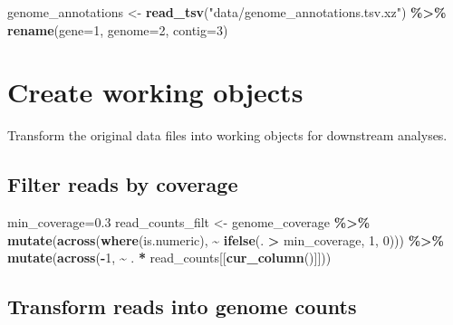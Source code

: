\documentclass[
]{book}
\newenvironment{Shaded}{\begin{snugshade}}{\end{snugshade}}
\newcommand{\AttributeTok}[1]{\textcolor[rgb]{0.13,0.29,0.53}{#1}}
\newcommand{\DecValTok}[1]{\textcolor[rgb]{0.00,0.00,0.81}{#1}}
\newcommand{\FloatTok}[1]{\textcolor[rgb]{0.00,0.00,0.81}{#1}}
\newcommand{\FunctionTok}[1]{\textcolor[rgb]{0.13,0.29,0.53}{\textbf{#1}}}
\newcommand{\NormalTok}[1]{#1}
\newcommand{\OtherTok}[1]{\textcolor[rgb]{0.56,0.35,0.01}{#1}}
\newcommand{\SpecialCharTok}[1]{\textcolor[rgb]{0.81,0.36,0.00}{\textbf{#1}}}
\newcommand{\StringTok}[1]{\textcolor[rgb]{0.31,0.60,0.02}{#1}}
\begin{document}
\begin{Shaded}
\begin{Highlighting}[]
\NormalTok{genome\_annotations }\OtherTok{\textless{}{-}} \FunctionTok{read\_tsv}\NormalTok{(}\StringTok{"data/genome\_annotations.tsv.xz"}\NormalTok{) }\SpecialCharTok{\%\textgreater{}\%}
    \FunctionTok{rename}\NormalTok{(}\AttributeTok{gene=}\DecValTok{1}\NormalTok{, }\AttributeTok{genome=}\DecValTok{2}\NormalTok{, }\AttributeTok{contig=}\DecValTok{3}\NormalTok{)}
\end{Highlighting}
\end{Shaded}

\section{Create working objects}\label{create-working-objects}

Transform the original data files into working objects for downstream
analyses.

\subsection{Filter reads by coverage}\label{filter-reads-by-coverage}

\begin{Shaded}
\begin{Highlighting}[]
\NormalTok{min\_coverage}\OtherTok{=}\FloatTok{0.3}
\NormalTok{read\_counts\_filt }\OtherTok{\textless{}{-}}\NormalTok{ genome\_coverage }\SpecialCharTok{\%\textgreater{}\%}
  \FunctionTok{mutate}\NormalTok{(}\FunctionTok{across}\NormalTok{(}\FunctionTok{where}\NormalTok{(is.numeric), }\SpecialCharTok{\textasciitilde{}} \FunctionTok{ifelse}\NormalTok{(. }\SpecialCharTok{\textgreater{}}\NormalTok{ min\_coverage, }\DecValTok{1}\NormalTok{, }\DecValTok{0}\NormalTok{))) }\SpecialCharTok{\%\textgreater{}\%}
  \FunctionTok{mutate}\NormalTok{(}\FunctionTok{across}\NormalTok{(}\SpecialCharTok{{-}}\DecValTok{1}\NormalTok{, }\SpecialCharTok{\textasciitilde{}}\NormalTok{ . }\SpecialCharTok{*}\NormalTok{ read\_counts[[}\FunctionTok{cur\_column}\NormalTok{()]])) }
\end{Highlighting}
\end{Shaded}

\subsection{Transform reads into genome
counts}\label{transform-reads-into-genome-counts}
\end{document}
